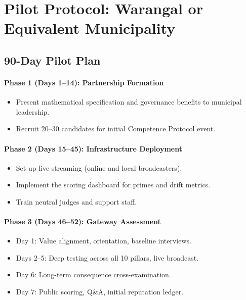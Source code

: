 \documentclass[11pt]{article}
\begin{document}
\section{Pilot Protocol: Warangal or Equivalent Municipality}

\subsection{90-Day Pilot Plan}

\paragraph{Phase 1 (Days 1--14): Partnership Formation}
\begin{itemize}[leftmargin=1.5em]
    \item Present mathematical specification and governance benefits to municipal leadership.
    \item Recruit 20--30 candidates for initial Competence Protocol event.
\end{itemize}

\paragraph{Phase 2 (Days 15--45): Infrastructure Deployment}
\begin{itemize}[leftmargin=1.5em]
    \item Set up live streaming (online and local broadcasters).
    \item Implement the scoring dashboard for primes and drift metrics.
    \item Train neutral judges and support staff.
\end{itemize}

\paragraph{Phase 3 (Days 46--52): Gateway Assessment}
\begin{itemize}[leftmargin=1.5em]
    \item Day 1: Value alignment, orientation, baseline interviews.
    \item Days 2--5: Deep testing across all 10 pillars, live broadcast.
    \item Day 6: Long-term consequence cross-examination.
    \item Day 7: Public scoring, Q\&A, initial reputation ledger.
\end{itemize}
\end{document}
